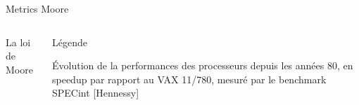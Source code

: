 %
\begin{Frame}{Metrics Moore}
  \begin{columns}[t]
    \begin{column}{\BW}
      \begin{block}{La loi de Moore}
      \end{block}
    \end{column}
    \begin{column}{\BW}
      \begin{block}{Légende}

        Évolution de la performances des processeurs depuis les années 80,
        en speedup par rapport au VAX 11/780, mesuré par le benchmark
        SPECint [Hennessy]
      \end{block}
    \end{column}
  \end{columns}

\end{Frame}


